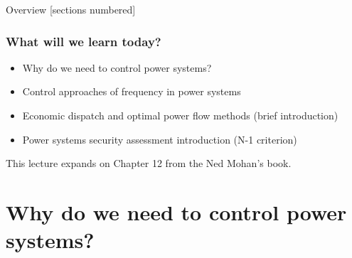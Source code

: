 \titleframe

\begin{frame}{Overview}
  [sections numbered]
  \tableofcontents[hideallsubsections]
\end{frame}








\begin{frame}
    \frametitle{What will we learn today?}
    \begin{itemize}
        \item Why do we need to control power systems?
        \item Control approaches of frequency in power systems
        \item Economic dispatch and optimal power flow methods (brief introduction) %
        \item Power systems security assessment introduction (N-1 criterion) %
    \end{itemize}
    This lecture expands on Chapter 12 from the Ned Mohan's book. %
\end{frame}


\section{Why do we need to control power systems?}

